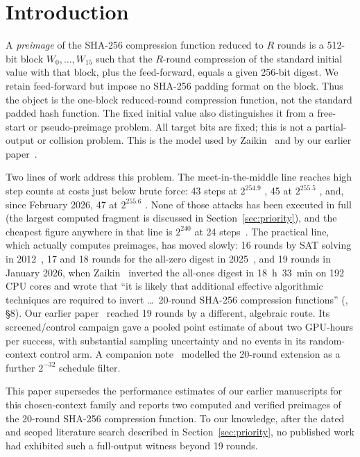 \documentclass[11pt,a4paper]{article}
\begin{document}
\section{Introduction}
\label{sec:intro}

A \emph{preimage} of the SHA-256 compression function reduced to $R$ rounds is
a 512-bit block $W_0,\dots,W_{15}$ such that the $R$-round compression of the
standard initial value with that block, plus the feed-forward, equals a given
256-bit digest.  We retain feed-forward but impose no SHA-256 padding format on
the block.  Thus the object is the one-block reduced-round compression
function, not the standard padded hash function.  The fixed initial value also
distinguishes it from a free-start or pseudo-preimage problem.  All target bits
are fixed; this is not a partial-output or collision problem.  This is the
model used by Zaikin~\cite{Zaikin2026} and by our earlier
paper~\cite{Basra2026R19}.

Two lines of work address this problem.  The meet-in-the-middle line reaches
high step counts at costs just below brute force: 43 steps at $2^{254.9}$
\cite{AokiGuo2009}, 45 at $2^{255.5}$ \cite{KRS2012}, and, since February
2026, 47 at $2^{255.6}$ \cite{GuoLiLiuWangZhang2026}.  None of those attacks
has been executed in full (the largest computed fragment is discussed in
Section~\ref{sec:priority}), and the cheapest figure anywhere in that line is $2^{240}$
at 24 steps~\cite{IsobeShibutani2009}.  The practical line, which actually
computes preimages, has moved slowly: 16 rounds by SAT solving in
2012~\cite{Homsirikamol2012}, 17 and 18 rounds for the all-zero digest in
2025~\cite{Davydov2025}, and 19 rounds in January 2026, when
Zaikin~\cite{Zaikin2026} inverted the all-ones digest in 18~h~33~min on 192
CPU cores and wrote that ``it is likely that additional effective algorithmic
techniques are required to invert \ldots\ 20-round SHA-256 compression
functions'' (\cite{Zaikin2026}, \S8).  Our earlier paper~\cite{Basra2026R19} reached 19 rounds by a
different, algebraic route.  Its screened/control campaign gave a pooled
point estimate of about two GPU-hours per success, with substantial sampling
uncertainty and no events in its random-context control arm.  A companion
note~\cite{Basra2026R20} modelled the 20-round extension as a further
$2^{-32}$ schedule filter.

This paper supersedes the performance estimates of our earlier manuscripts
for this chosen-context family and reports two computed and verified preimages
of the 20-round SHA-256 compression function.  To our knowledge, after the
dated and scoped literature search described in Section~\ref{sec:priority}, no
published work had exhibited such a full-output witness beyond 19 rounds.
\end{document}
